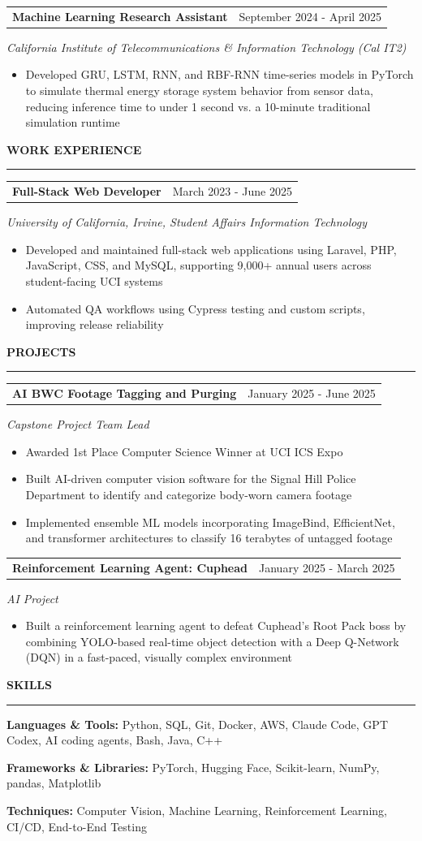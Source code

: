 \documentclass[10pt,letterpaper]{article}
\makeatletter
\newcommand{\ressection}[1]{%
  \vspace{6pt}%
  {\fontsize{11.5pt}{12pt}\selectfont\bfseries\MakeUppercase{#1}}%
  \vspace{1pt}\par\hrule\vspace{3pt}%
}
\newcommand{\entryheading}[2]{%
  \begin{tabular*}{\textwidth}{@{\extracolsep{\fill}}lr}
    \textbf{#1} & #2
  \end{tabular*}%
}
\makeatother
\begin{document}
\vspace{2pt}
\entryheading{Machine Learning Research Assistant}{September 2024 - April 2025}
\textit{California Institute of Telecommunications \& Information Technology (Cal IT2)}
\begin{itemize}
  \item Developed GRU, LSTM, RNN, and RBF-RNN time-series models in PyTorch to simulate thermal energy storage system behavior from sensor data, reducing inference time to under 1 second vs. a 10-minute traditional simulation runtime
\end{itemize}

\ressection{Work Experience}
\entryheading{Full-Stack Web Developer}{March 2023 - June 2025}
\textit{University of California, Irvine, Student Affairs Information Technology}
\begin{itemize}
  \item Developed and maintained full-stack web applications using Laravel, PHP, JavaScript, CSS, and MySQL, supporting 9,000+ annual users across student-facing UCI systems
  \item Automated QA workflows using Cypress testing and custom scripts, improving release reliability
\end{itemize}

\ressection{Projects}
\entryheading{AI BWC Footage Tagging and Purging}{January 2025 - June 2025}
\textit{Capstone Project Team Lead}
\begin{itemize}
  \item Awarded 1st Place Computer Science Winner at UCI ICS Expo
  \item Built AI-driven computer vision software for the Signal Hill Police Department to identify and categorize body-worn camera footage
  \item Implemented ensemble ML models incorporating ImageBind, EfficientNet, and transformer architectures to classify 16 terabytes of untagged footage
\end{itemize}

\vspace{2pt}
\entryheading{Reinforcement Learning Agent: Cuphead}{January 2025 - March 2025}
\textit{AI Project}
\begin{itemize}
  \item Built a reinforcement learning agent to defeat Cuphead's Root Pack boss by combining YOLO-based real-time object detection with a Deep Q-Network (DQN) in a fast-paced, visually complex environment
\end{itemize}

\ressection{Skills}
\textbf{Languages \& Tools:} Python, SQL, Git, Docker, AWS, Claude Code, GPT Codex, AI coding agents, Bash, Java, C++\par
\textbf{Frameworks \& Libraries:} PyTorch, Hugging Face, Scikit-learn, NumPy, pandas, Matplotlib\par
\textbf{Techniques:} Computer Vision, Machine Learning, Reinforcement Learning, CI/CD, End-to-End Testing
\end{document}
